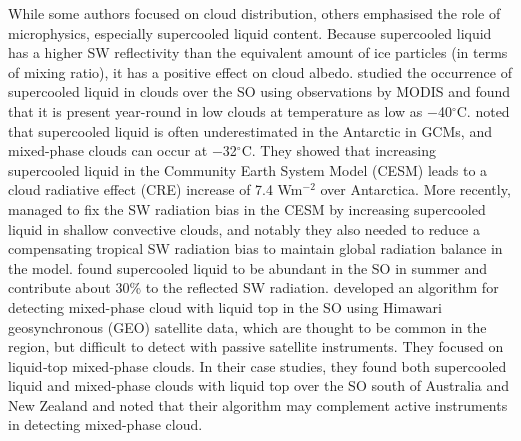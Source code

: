 While some authors focused on cloud distribution, others
emphasised the role of microphysics, especially supercooled liquid content.
Because supercooled liquid has a higher SW reflectivity than the equivalent amount
of ice particles (in terms of mixing ratio), it has a positive effect on cloud albedo.
\cite{morrison2011} studied the occurrence of supercooled liquid in clouds
over the SO using observations by MODIS and
found that it is present year-round in low clouds at temperature as low as
$-$40$^{\circ}$C.
\cite{lawson2014} noted that supercooled liquid is often
underestimated in the Antarctic in GCMs, and mixed-phase clouds can occur at
$-$32$^{\circ}$C.
They showed that increasing supercooled liquid in the
Community Earth System Model (CESM) leads to a cloud radiative effect (CRE)
increase of 7.4 Wm$^{-2}$ over Antarctica. More recently, \cite{kay2016}
managed to fix the SW radiation bias in the CESM by increasing supercooled liquid
in shallow convective clouds, and notably they also needed to reduce a
compensating tropical SW radiation bias to maintain global radiation balance
in the model.
\cite{bodas-salcedo2016} found supercooled liquid to be abundant in
the SO in summer and contribute about 30\% to the reflected
SW radiation.
\cite{noh2019} developed an algorithm for detecting mixed-phase cloud with
liquid top in the SO using Himawari geosynchronous (GEO) satellite data, which are thought
to be common in the region, but difficult to detect with passive satellite
instruments. They focused on liquid‐top mixed‐phase clouds. In their case studies, they found both supercooled liquid
and mixed-phase clouds with liquid top over the SO south of Australia and
New Zealand and noted that their algorithm may complement active instruments
in detecting mixed-phase cloud.


